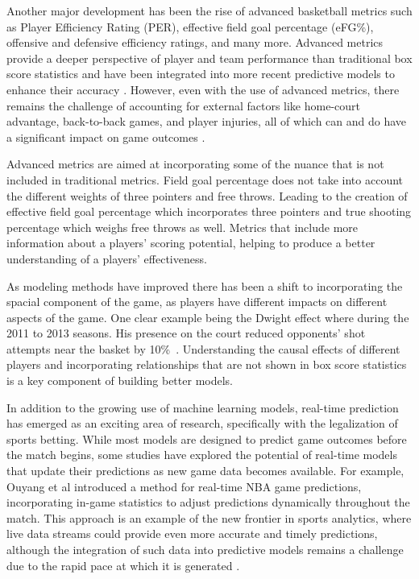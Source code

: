 \documentclass[11pt]{article}
\begin{document}
Another major development has been the rise of advanced basketball metrics such as Player Efficiency Rating (PER), effective field goal percentage (eFG\%), offensive and defensive efficiency ratings, and many more. Advanced metrics provide a deeper perspective of player and team performance than traditional box score statistics and have been integrated into more recent predictive models to enhance their accuracy \cite{Osken_Onay_2022}. However, even with the use of advanced metrics, there remains the challenge of accounting for external factors like home-court advantage, back-to-back games, and player injuries, all of which can and do have a significant impact on game outcomes \cite{Manner_2016}.\medskip

Advanced metrics are aimed at incorporating some of the nuance that is not included in traditional metrics. Field goal percentage does not take into account the different weights of three pointers and free throws.  Leading to the creation of effective field goal percentage which incorporates three pointers and true shooting percentage which weighs free throws as well. Metrics that include more information about a players' scoring potential, helping to produce a better understanding of a players' effectiveness. \medskip

As modeling methods have improved there has been a shift to incorporating the spacial component of the game, as players have different impacts on different aspects of the game. One clear example being the Dwight effect where during the 2011 to 2013 seasons. His presence on the court reduced opponents' shot attempts near the basket by 10\%\ \cite{goldsberry2013dwight}. Understanding the causal effects of different players and incorporating relationships that are not shown in box score statistics is a key component of building better models. \medskip

In addition to the growing use of machine learning models, real-time prediction has emerged as an exciting area of research, specifically with the legalization of sports betting. While most models are designed to predict game outcomes before the match begins, some studies have explored the potential of real-time models that update their predictions as new game data becomes available. For example, Ouyang et al introduced a method for real-time NBA game predictions, incorporating in-game statistics to adjust predictions dynamically throughout the match. This approach is an example of the new frontier in sports analytics, where live data streams could provide even more accurate and timely predictions, although the integration of such data into predictive models remains a challenge due to the rapid pace at which it is generated \cite{Ouyang_Li_Zhou_Wei_Zheng_Feng_Peng_2024}.\medskip
\end{document}
